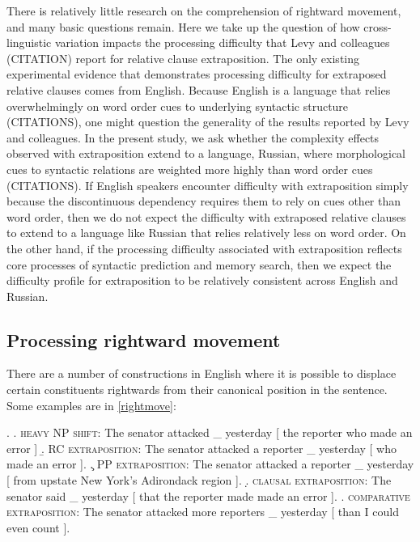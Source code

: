 \documentclass[12pt]{article}
\begin{document}
	There is relatively little research on the comprehension of rightward movement, and many basic questions remain. Here we take up the question of how cross-linguistic variation impacts the processing difficulty that Levy and colleagues (CITATION) report for relative clause extraposition. The only existing experimental evidence that demonstrates processing difficulty for extraposed relative clauses comes from English. Because English is a language that relies overwhelmingly on word order cues to underlying syntactic structure (CITATIONS), one might question the generality of the results reported by Levy and colleagues. In the present study, we ask whether the complexity effects observed with extraposition extend to a language, Russian, where morphological cues to syntactic relations are weighted more highly than word order cues (CITATIONS). If English speakers encounter difficulty with extraposition simply because the discontinuous dependency requires them to rely on cues other than word order, then we do not expect the difficulty with extraposed relative clauses to extend to a language like Russian that relies relatively less on word order. On the other hand, if the processing difficulty associated with extraposition reflects core processes of syntactic prediction and memory search, then we expect the difficulty profile for extraposition to be relatively consistent across English and Russian. 
									
	\subsection{Processing rightward movement}
\label{sec:rightward}
	
	There are a number of constructions in English where it is possible to displace certain constituents rightwards from their canonical position in the sentence. Some examples are in \ref{rightmove}: 

	\ex.	\label{rightmove}
		\a.	\label{hnps} \textsc{heavy NP shift}: The senator attacked \_ yesterday [ the reporter who made an error ]
		\b.	\label{rcex} \textsc{RC extraposition}: The senator attacked a reporter \_  yesterday [ who made an error ]. 
		\c.	\label{ppex} \textsc{PP extraposition}: The senator attacked a reporter \_  yesterday [ from upstate New York's Adirondack region ]. 
		\d.	\label{compex} \textsc{clausal extraposition}: The senator said  \_ yesterday [ that the reporter made made an error ]. 
		\e.	\label{comparex} \textsc{comparative extraposition}: The senator attacked more reporters  \_ yesterday [ than I could even count ]. 
\end{document}

